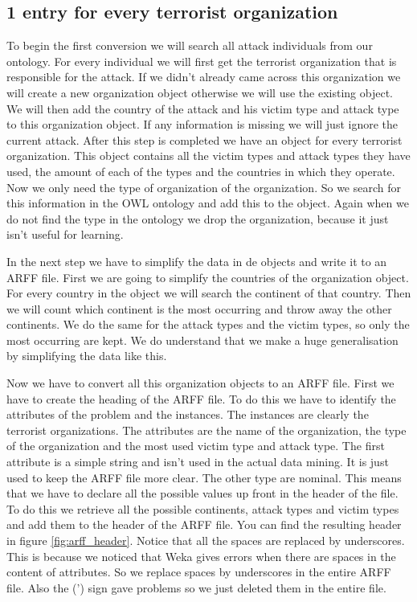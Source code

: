 \documentclass[a4]{article}
\begin{document}
\subsection{1 entry for every terrorist organization}
\label{sec:1_for_organization}
To begin the first conversion we will search all attack individuals from our ontology. For every individual we will first get the terrorist organization that is responsible for the attack. If we didn't already came across this organization we will create a new organization object otherwise we will use the existing object. We will then add the country of the attack and his victim type and attack type to this organization object. If any information is missing we will just ignore the current attack. After this step is completed we have an object for every terrorist organization. This object contains all the victim types and attack types they have used, the amount of each of the types and the countries in which they operate. Now we only need the type of organization of the organization. So we search for this information in the OWL ontology and add this to the object. Again when we do not find the type in the ontology we drop the organization, because it just isn't useful for learning.\par
In the next step we have to simplify the data in de objects and write it to an ARFF file. First we are going to simplify the countries of the organization object. For every country in the object we will search the continent of that country. Then we will count which continent is the most occurring and throw away the other continents. We do the same for the attack types and the victim types, so only the most occurring are kept. We do understand that we make a huge generalisation by simplifying the data like this.\par
Now we have to convert all this organization objects to an ARFF file. First we have to create the heading of the ARFF file. To do this we have to identify the attributes of the problem and the instances. The instances are clearly the terrorist organizations. The attributes are the name of the organization, the type of the organization and the most used victim type and attack type. The first attribute is a simple string and isn't used in the actual data mining. It is just used to keep the ARFF file more clear. The other type are nominal. This means that we have to declare all the possible values up front in the header of the file. To do this we retrieve all the possible continents, attack types and victim types and add them to the header of the ARFF file. You can find the resulting header in figure \ref{fig:arff_header}. Notice that all the spaces are replaced by underscores. This is because we noticed that Weka gives errors when there are spaces in the content of attributes. So we replace spaces by underscores in the entire ARFF file. Also the (') sign gave problems so we just deleted them in the entire file.\par
\end{document}
